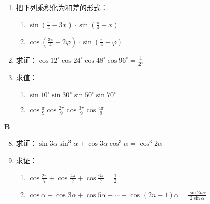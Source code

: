 \begin{enumerate}
\item 把下列乘积化为和差的形式：
\begin{multicols}{2}
\begin{enumerate}[(1)]
    \item $\sin\left(\frac{\pi}{4}-3x\right)\cdot \sin\left(\frac{\pi}{4}+x\right)$
    \item $\cos\left(\frac{3\pi}{4}+2\varphi\right)\cdot \sin\left(\frac{\pi}{4}-\varphi\right)$
\end{enumerate}
\end{multicols}
\item 求证：$\cos12^{\circ}\cos24^{\circ}\cos48^{\circ}\cos96^{\circ}=\frac{1}{2^4}$
\item 求值：
\begin{multicols}{2}
\begin{enumerate}[(1)]
    \item $\sin10^{\circ}\sin30^{\circ}\sin50^{\circ}\sin70^{\circ}$
    \item $\cos\frac{\pi}{9}\cos\frac{2\pi}{9}\cos\frac{3\pi}{9}\cos\frac{4\pi}{9}$
\end{enumerate}
\end{multicols}
\end{enumerate}

\begin{center}
    \bfseries B
\end{center}

\begin{enumerate}\setcounter{enumi}{7}
    \item 求证：$\sin3\alpha\sin^3 \alpha+\cos3\alpha\cos^3 \alpha=\cos^3 2\alpha$
    \item 求证：
\begin{enumerate}[(1)]
    \item $\cos\frac{2\pi}{7}+\cos\frac{4\pi}{7}+\cos\frac{6\pi}{7}=\frac{1}{2}$
    \item $\cos\alpha+\cos3\alpha+\cos5\alpha+\cdots+\cos(2n-1)\alpha=\frac{\sin2n\alpha}{2\sin\alpha}$
\end{enumerate}
\end{enumerate}

